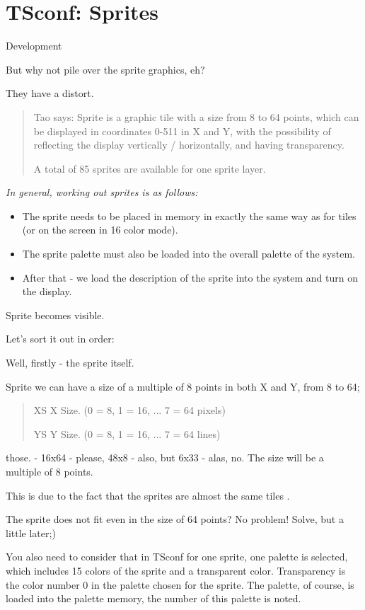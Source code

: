 \documentclass{article}
\begin{document}
\section*{TSconf: Sprites}

Development

But why not pile over the sprite graphics, eh?

They have a distort.

\begin{quotation}
  Tao says: Sprite is a graphic tile with a size from 8 to 64 points,
  which can be displayed in coordinates 0-511 in X and Y, with the
  possibility of reflecting the display vertically / horizontally, and
  having transparency.

  A total of 85 sprites are available for one sprite layer.
\end{quotation}

\emph{In general, working out sprites is as follows:}

\begin{itemize}
\item The sprite needs to be placed in memory in exactly the same way
  as for tiles (or on the screen in 16 color mode).
\item The sprite palette must also be loaded into the overall palette
  of the system.
\item After that - we load the description of the sprite into the
  system and turn on the display.
\end{itemize}
Sprite becomes visible.

Let's sort it out in order:

Well, firstly - the sprite itself.

Sprite we can have a size of a multiple of 8 points in both X and Y,
from 8 to 64;

\begin{quotation}
  XS X Size. (0 = 8, 1 = 16, ... 7 = 64 pixels)

  YS Y Size. (0 = 8, 1 = 16, ... 7 = 64 lines)

\end{quotation}
those. - 16x64 - please, 48x8 - also, but 6x33 - alas, no. The size
will be a multiple of 8 points.

This is due to the fact that the sprites are almost the same tiles .

The sprite does not fit even in the size of 64 points? No problem!
Solve, but a little later;)

You also need to consider that in TSconf for one sprite, one palette
is selected, which includes 15 colors of the sprite and a transparent
color. Transparency is the color number 0 in the palette chosen for
the sprite. The palette, of course, is loaded into the palette memory,
the number of this palette is noted.
\end{document}
